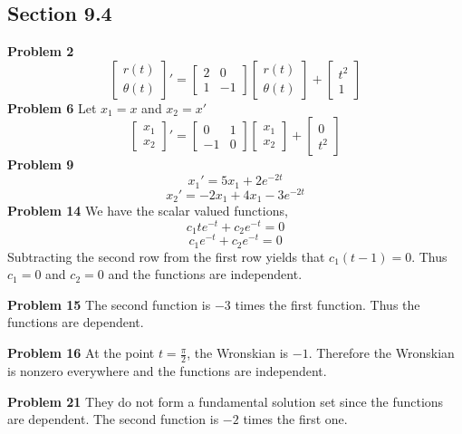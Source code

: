 \subsection*{Section 9.4}
\textbf{Problem 2}
\[
    \begin{bmatrix}
        r(t) \\ \theta(t)
    \end{bmatrix}'
    =
    \begin{bmatrix}
        2 & 0 \\
        1 & -1
    \end{bmatrix}
    \begin{bmatrix}
        r(t) \\ \theta(t)
    \end{bmatrix}
    +
    \begin{bmatrix}
        t^2 \\ 1
    \end{bmatrix}
\]
\textbf{Problem 6}
Let $x_1 = x$ and $x_2 = x'$
\[
    \begin{bmatrix}
        x_1 \\ x_2
    \end{bmatrix}'
    =
    \begin{bmatrix}
        0 & 1 \\
        -1 & 0
    \end{bmatrix}
    \begin{bmatrix}
        x_1 \\ x_2
    \end{bmatrix}
    +
    \begin{bmatrix}
        0 \\ t^2
    \end{bmatrix}
\]
\textbf{Problem 9}
\[
    x_1' = 5x_1 + 2e^{-2t}
\]
\[
    x_2' = -2x_1 + 4x_1 -3e^{-2t}
\]
\textbf{Problem 14}
We have the scalar valued functions,
\[
    c_1te^{-t} + c_2e^{-t} = 0
\]
\[
    c_1e^{-t} + c_2e^{-t} = 0
\]
Subtracting the second row from the first row yields 
that $c_1(t-1) = 0$.
Thus $c_1 = 0$ and $c_2 = 0$ and the functions are independent.

\textbf{Problem 15}
The second function is $-3$ times the first function.
Thus the functions are dependent.

\textbf{Problem 16}
At the point $t = \frac{\pi}{2}$, the Wronskian is $-1$.
Therefore the Wronskian is nonzero everywhere and the functions 
are independent.

\textbf{Problem 21}
They do not form a fundamental solution set since the functions are dependent.
The second function is $-2$ times the first one.

